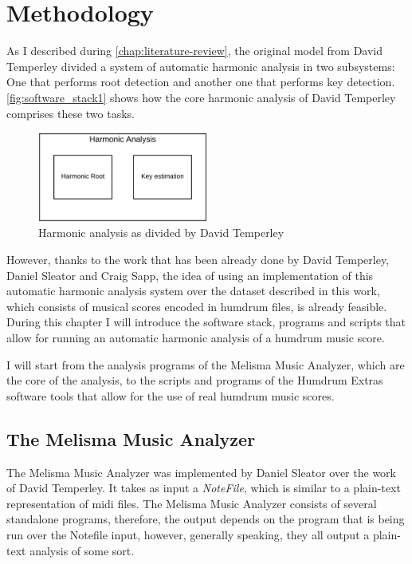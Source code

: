 \normallinespacing

\chapter{Methodology}
\label{chap:methodology}

As I described during \autoref{chap:literature-review}, the original model from David Temperley divided a system of automatic harmonic analysis in two subsystems: One that performs root detection and another one that performs key detection. \autoref{fig:software_stack1} shows how the core harmonic analysis of David Temperley comprises these two tasks.

\begin{figure}[ht]
  \centering
    \includegraphics[width=0.5\textwidth]{04-methodology/figures/1}
  \caption{Harmonic analysis as divided by David Temperley}
  \label{fig:software_stack1}
\end{figure}

However, thanks to the work that has been already done by David Temperley, Daniel Sleator and Craig Sapp, the idea of using an implementation of this automatic harmonic analysis system over the dataset described in this work, which consists of musical scores encoded in humdrum files, is already feasible. During this chapter I will introduce the software stack, programs and scripts that allow for running an automatic harmonic analysis of a humdrum music score.

I will start from the analysis programs of the Melisma Music Analyzer, which are the core of the analysis, to the scripts and programs of the Humdrum Extras software tools that allow for the use of real humdrum music scores.

\section{The Melisma Music Analyzer}
  The Melisma Music Analyzer was implemented by Daniel Sleator over the work of David Temperley. It takes as input a \emph{NoteFile}, which is similar to a plain-text representation of midi files. The Melisma Music Analyzer consists of several standalone programs, therefore, the output depends on the program that is being run over the Notefile input, however, generally speaking, they all output a plain-text analysis of some sort.

